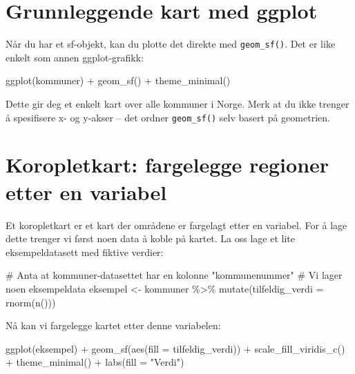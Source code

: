 \documentclass[
  norsk,
  letterpaper,
  DIV=11,
  numbers=noendperiod]{scrreprt}
\newenvironment{Shaded}{\begin{snugshade}}{\end{snugshade}}
\newcommand{\AttributeTok}[1]{\textcolor[rgb]{0.40,0.45,0.13}{#1}}
\newcommand{\CommentTok}[1]{\textcolor[rgb]{0.37,0.37,0.37}{#1}}
\newcommand{\FunctionTok}[1]{\textcolor[rgb]{0.28,0.35,0.67}{#1}}
\newcommand{\NormalTok}[1]{\textcolor[rgb]{0.00,0.23,0.31}{#1}}
\newcommand{\OtherTok}[1]{\textcolor[rgb]{0.00,0.23,0.31}{#1}}
\newcommand{\SpecialCharTok}[1]{\textcolor[rgb]{0.37,0.37,0.37}{#1}}
\newcommand{\StringTok}[1]{\textcolor[rgb]{0.13,0.47,0.30}{#1}}
\theoremstyle{definition}
\theoremstyle{remark}
\begin{document}
\section{Grunnleggende kart med
ggplot}\label{grunnleggende-kart-med-ggplot}

Når du har et sf-objekt, kan du plotte det direkte med
\texttt{geom\_sf()}. Det er like enkelt som annen ggplot-grafikk:

\begin{Shaded}
\begin{Highlighting}[]
\FunctionTok{ggplot}\NormalTok{(kommuner) }\SpecialCharTok{+}
  \FunctionTok{geom\_sf}\NormalTok{() }\SpecialCharTok{+}
  \FunctionTok{theme\_minimal}\NormalTok{()}
\end{Highlighting}
\end{Shaded}

Dette gir deg et enkelt kart over alle kommuner i Norge. Merk at du ikke
trenger å spesifisere x- og y-akser -- det ordner \texttt{geom\_sf()}
selv basert på geometrien.

\section{Koropletkart: fargelegge regioner etter en
variabel}\label{koropletkart-fargelegge-regioner-etter-en-variabel}

Et koropletkart er et kart der områdene er fargelagt etter en variabel.
For å lage dette trenger vi først noen data å koble på kartet. La oss
lage et lite eksempeldatasett med fiktive verdier:

\begin{Shaded}
\begin{Highlighting}[]
\CommentTok{\# Anta at kommuner{-}datasettet har en kolonne "kommunenummer"}
\CommentTok{\# Vi lager noen eksempeldata}
\NormalTok{eksempel }\OtherTok{\textless{}{-}}\NormalTok{ kommuner }\SpecialCharTok{\%\textgreater{}\%}
  \FunctionTok{mutate}\NormalTok{(}\AttributeTok{tilfeldig\_verdi =} \FunctionTok{rnorm}\NormalTok{(}\FunctionTok{n}\NormalTok{()))}
\end{Highlighting}
\end{Shaded}

Nå kan vi fargelegge kartet etter denne variabelen:

\begin{Shaded}
\begin{Highlighting}[]
\FunctionTok{ggplot}\NormalTok{(eksempel) }\SpecialCharTok{+}
  \FunctionTok{geom\_sf}\NormalTok{(}\FunctionTok{aes}\NormalTok{(}\AttributeTok{fill =}\NormalTok{ tilfeldig\_verdi)) }\SpecialCharTok{+}
  \FunctionTok{scale\_fill\_viridis\_c}\NormalTok{() }\SpecialCharTok{+}
  \FunctionTok{theme\_minimal}\NormalTok{() }\SpecialCharTok{+}
  \FunctionTok{labs}\NormalTok{(}\AttributeTok{fill =} \StringTok{"Verdi"}\NormalTok{)}
\end{Highlighting}
\end{Shaded}
\end{document}
